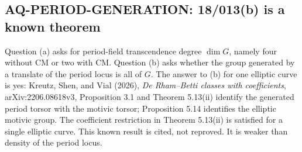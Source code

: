\documentclass[11pt,a4paper]{article}
\theoremstyle{definition}\newtheorem{definition}[theorem]{Definition}
\theoremstyle{remark}\newtheorem{remark}[theorem]{Remark}
\begin{document}
\subsection{AQ-PERIOD-GENERATION: 18/013(b) is a known theorem}
Question (a) asks for period-field transcendence degree
$\dim G$, namely four without CM or two with CM.
Question (b) asks whether the group generated by a
translate of the period locus is all of $G$.
The answer to (b) for one elliptic curve is yes:
Kreutz, Shen, and Vial (2026), \emph{De Rham--Betti classes
with coefficients}, arXiv:2206.08618v3, Proposition 3.1
and Theorem 5.13(ii) identify the generated period torsor
with the motivic torsor; Proposition 5.14 identifies
the elliptic motivic group. The coefficient restriction
in Theorem 5.13(ii) is satisfied for a single elliptic
curve. This known result is cited, not reproved.
It is weaker than density of the period locus.
\end{document}

